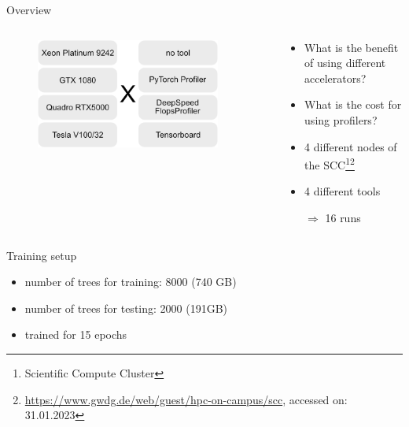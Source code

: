 \documentclass[compress,aspectratio=169]{beamer}
\begin{document}
\begin{frame}{Overview}
\begin{columns}
        \begin{column}{0.5\textwidth}
            \centering
            \vspace{-1em}
            \begin{figure}
            \includegraphics[width=0.9\textwidth]{./assets/experiments.png}
            \end{figure}
        \end{column}
        \begin{column}{0.5\textwidth}
            \begin{itemize}
                \item What is the benefit of using different accelerators?
                \item What is the cost for using profilers?
                \vspace{2em}
                \hline
                \vspace{2em}
                \item 4 different nodes of the SCC\footnote{\tiny{Scientific Compute Cluster}}\footnote{\tiny{\url{https://www.gwdg.de/web/guest/hpc-on-campus/scc}}, accessed on: 31.01.2023}
                \item 4 different tools
                \item[$\Rightarrow$] 16 runs
            \end{itemize}
            \vspace{1em}
        \end{column}
    \end{columns}

\end{frame}

\begin{frame}{Training setup}
\begin{itemize}
    \item number of trees for training: 8000 (740 GB)
    \vspace{1em}
    \item number of trees for testing: 2000 (191GB)
    \vspace{1em}
    \item trained for 15 epochs
\end{itemize}
\end{frame}
\end{document}
